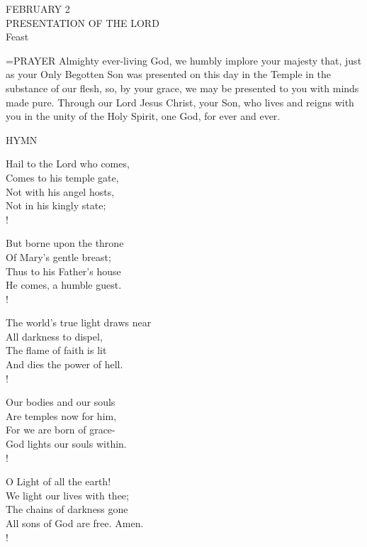\begin{center}\normalsize FEBRUARY 2\\
\footnotesize PRESENTATION OF THE LORD\\
\footnotesize Feast\\
\end{center}

\hangindent=\parindent \small{PRAYER 
Almighty ever-living God, we humbly implore your majesty that, just as your Only Begotten Son was presented on this day in the Temple in the substance of our flesh, so, by your grace, we may be presented to you with minds made pure. Through our Lord Jesus Christ, your Son, who lives and reigns with you in the unity of the Holy Spirit, one God, for ever and ever.\\}
 
\noindent\small{\uppercase{Hymn}}\normalsize\label{proper:presentationofthelord:hymn}
\begin{cverse}
Hail to the Lord who comes,\\
Comes to his temple gate,\\
Not with his angel hosts,\\
Not in his kingly state;\\!

But borne upon the throne\\
Of Mary’s gentle breast;\\
Thus to his Father’s house\\
He comes, a humble guest.\\!

The world’s true light draws near\\
All darkness to dispel,\\
The flame of faith is lit\\
And dies the power of hell.\\!

Our bodies and our souls\\
Are temples now for him,\\
For we are born of grace-\\
God lights our souls within.\\!

O Light of all the earth!\\
We light our lives with thee;\\
The chains of darkness gone\\
All sons of God are free. Amen.\\!
\end{cverse}

